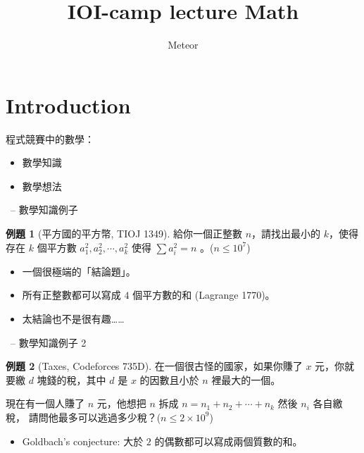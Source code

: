 \documentclass[notheorems]{beamer}
\title{IOI-camp lecture Math}
\author{Meteor}
\theoremstyle{definition}
\newtheorem{problem}{例題}
\begin{document}
\begin{frame}
  \titlepage
\end{frame}

\section{Introduction}

\begin{frame}{\secname}
  程式競賽中的數學：

  \begin{itemize}
    \setlength{\itemindent}{2em}
    \item<2-> 數學知識
    \item<3> 數學想法
  \end{itemize}
\end{frame}

\begin{frame}[t]{\secname \ -- 數學知識例子}
  \begin{problem}[平方國的平方幣, TIOJ 1349]
    給你一個正整數 $n$，請找出最小的 $k$，使得存在 $k$ 個平方數 $a_1^2, a_2^2, \cdots, a_k^2$
    使得 $\sum a_i^2 = n$ 。($n \leq 10^7$)
  \end{problem}

  \begin{itemize}
    \item<2-> 一個很極端的「結論題」。
    \item<3-> 所有正整數都可以寫成 $4$ 個平方數的和 (Lagrange 1770)。
    \item<4-> 太結論也不是很有趣……
  \end{itemize}
\end{frame}

\begin{frame}[t]{\secname \ -- 數學知識例子 2}
  \begin{problem}[Taxes, Codeforces 735D]%
    在一個很古怪的國家，如果你賺了 $x$ 元，你就要繳 $d$ 塊錢的稅，其中 $d$ 是 $x$ 的因數且小於
    $n$ 裡最大的一個。

    \medskip
    現在有一個人賺了 $n$ 元，他想把 $n$ 拆成 $n = n_1 + n_2 + \cdots + n_k$ 然後 $n_i$ 各自繳稅，
    請問他最多可以逃過多少稅？($n \leq 2 \times 10^9$)
  \end{problem}

  \begin{itemize}
    \item<2-> Goldbach's conjecture: 大於 $2$ 的偶數都可以寫成兩個質數的和。
  \end{itemize}
\end{frame}
\end{document}
